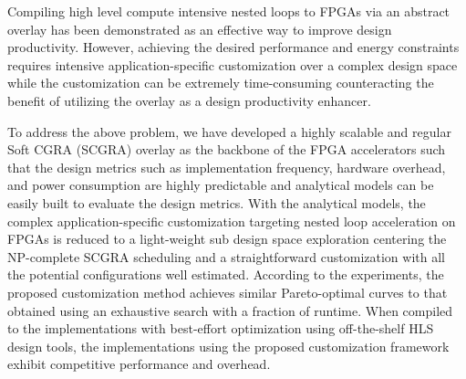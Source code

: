 Compiling high level compute intensive nested loops to 
FPGAs via an abstract overlay has been demonstrated as an effective 
way to improve design productivity. However, achieving 
the desired performance and energy constraints requires intensive 
application-specific customization over a complex design space 
while the customization can be extremely time-consuming 
counteracting the benefit of utilizing the overlay as a 
design productivity enhancer. 
 
To address the above problem, we have developed a highly scalable and 
regular Soft CGRA (SCGRA) overlay as the backbone of the FPGA accelerators such 
that the design metrics such as implementation frequency, hardware 
overhead, and power consumption are highly predictable and analytical 
models can be easily built to evaluate the design metrics. 
With the analytical models, the complex application-specific 
customization targeting nested loop acceleration on FPGAs is reduced 
to a light-weight sub design space exploration centering the 
NP-complete SCGRA scheduling and a straightforward customization 
with all the potential configurations well estimated. According to the 
experiments, the proposed customization method achieves 
similar Pareto-optimal curves to that obtained using an 
exhaustive search with a fraction of runtime. When compiled to 
the implementations with best-effort optimization using 
off-the-shelf HLS design tools, the implementations using the 
proposed customization framework exhibit competitive performance and overhead. 

